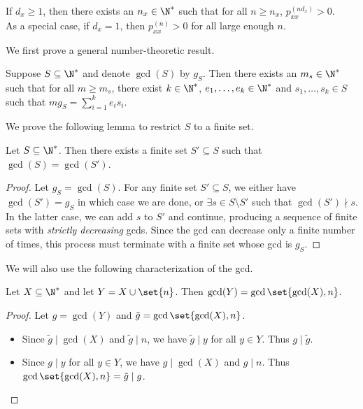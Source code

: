 \begin{theorem} \label{thm:schur_recurrence}
    If $d_x \ge 1$, then there exists an $n_x \in \N^*$ such that for all
    $n \ge n_x$, $p_{xx}^{(nd_x)} > 0$. \\
    As a special case, if $d_x = 1$, then $p_{xx}^{(n)} > 0$ for all
    large enough $n$.
\end{theorem}
We first prove a general number-theoretic result.

\begin{theorem} \label{thm:schur}
    Suppose $S \subseteq \N^*$ and denote $\gcd(S)$ by $g_S$.
    Then there exists an $m_s \in \N^*$ such that for all $m \ge m_s$,
    there exist $k \in \N^*$, $e_1, \dots, e_k \in \N^*$ and
    $s_1, \dots, s_k \in S$ such that $m g_S = \sum_{i=1}^k e_i s_i$.
\end{theorem}
We prove the following lemma to restrict $S$ to a finite set.
\begin{lemma}
    Let $S \subseteq \N^*$.
    Then there exists a finite set $S' \subseteq S$ such that
    $\gcd(S) = \gcd(S')$.
\end{lemma}
\begin{proof}
    Let $g_S = \gcd(S)$.
    For any finite set $S' \subseteq S$, we either have $\gcd(S') = g_S$
    in which case we are done, or $\exists s \in S \setminus S'$ such that
    $\gcd(S') \nmid s$.
    In the latter case, we can add $s$ to $S'$ and continue, producing a
    sequence of finite sets with \emph{strictly decreasing} gcds.
    Since the gcd can decrease only a finite number of times, this process
    must terminate with a finite set whose gcd is $g_S$.
\end{proof}
We will also use the following characterization of the gcd.
\begin{lemma}
    Let $X \subseteq \N^*$ and let $Y = X \cup \set{n}$.
    Then $\gcd(Y) = \gcd\set{\gcd(X), n}$.
\end{lemma}
\begin{proof}
    Let $g = \gcd(Y)$ and $\tilde{g} = \gcd\set{\gcd(X), n}$.
    \begin{itemize}
        \item Since $\tilde{g} \mid \gcd(X)$ and $\tilde{g} \mid n$, we have
        $\tilde{g} \mid y$ for all $y \in Y$.
        Thus $g \mid \tilde{g}$.
        \item Since $g \mid y$ for all $y \in Y$, we have $g \mid \gcd(X)$
        and $g \mid n$.
        Thus $\gcd\set{\gcd(X), n} = \tilde{g} \mid g$. \qedhere
    \end{itemize}
\end{proof}
